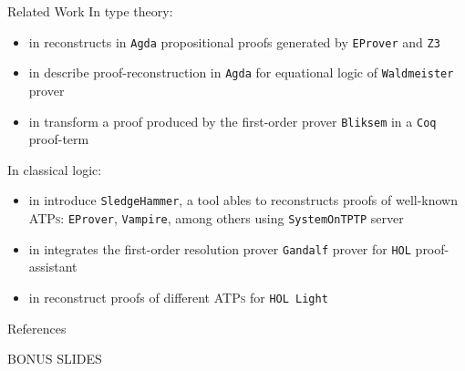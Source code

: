 \documentclass[10pt, xetex, hyperref={pdfpagelabels=false}]{beamer}
\newcommand{\abbre}[1]{\textsc{#1}\xspace}
\newcommand{\ATPs}{\abbre{ATPs}}
\newcommand{\name}[1]{\texttt{#1}\xspace}
\newcommand{\prg}[1]{\texttt{#1}\xspace}
\newcommand{\Agda}{\prg{Agda}}
\begin{document}
\begin{frame}{Related Work}
In type theory:
\begin{itemize}
  \item \citeauthor{Kanso2012} in \cite{Kanso2012} reconstructs in \Agda propositional proofs generated by \name{EProver} and \name{Z3}
  \item \citeauthor{foster2011integrating} in \cite{foster2011integrating}
  describe proof-reconstruction in \Agda for equational logic of \name{Waldmeister} prover
  \item \citeauthor{Bezem2002} in \cite{Bezem2002} transform a proof produced by the first-order prover \name{Bliksem} in a \name{Coq} proof-term
\end{itemize}
In classical logic:
\begin{itemize}
\item \citeauthor{paulson2007source} in \cite{paulson2007source} introduce
\name{SledgeHammer}, a tool ables to reconstructs proofs of well-known \ATPs: \name{EProver}, \name{Vampire}, among others using \name{SystemOnTPTP} server
\item \citeauthor{Hurd1999} in \cite{Hurd1999} integrates the first-order resolution prover \name{Gandalf} prover for \name{HOL} proof-assistant
\item \citeauthor{kaliszyk2013} in \cite{kaliszyk2013} reconstruct proofs
of different \ATPs for \name{HOL Light}
\end{itemize}
\end{frame}

\begin{frame}[allowframebreaks]{References}
\printbibliography
\end{frame}

\begin{frame}{BONUS SLIDES}
\end{frame}
\end{document}
